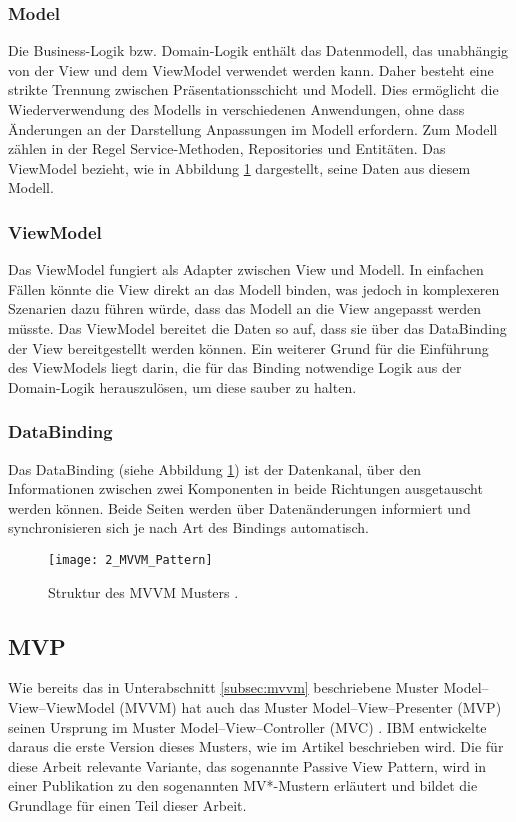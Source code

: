\subsubsection{Model}
Die Business-Logik bzw. Domain-Logik enthält das Datenmodell, das unabhängig von der View und dem ViewModel verwendet werden kann. 
Daher besteht eine strikte Trennung zwischen Präsentationsschicht und Modell. 
Dies ermöglicht die Wiederverwendung des Modells in verschiedenen Anwendungen, ohne dass Änderungen an der Darstellung Anpassungen im Modell erfordern. 
Zum Modell zählen in der Regel Service-Methoden, Repositories und Entitäten. 
Das ViewModel bezieht, wie in Abbildung \ref{fig:mvvm_pattern} dargestellt, seine Daten aus diesem Modell.

\subsubsection{ViewModel}
Das ViewModel fungiert als Adapter zwischen View und Modell. In einfachen Fällen könnte die View direkt an das Modell binden, was jedoch in komplexeren Szenarien dazu führen würde, dass das Modell an die View angepasst werden müsste. Das ViewModel bereitet die Daten so auf, dass sie über das DataBinding der View bereitgestellt werden können. 
Ein weiterer Grund für die Einführung des ViewModels liegt darin, die für das Binding notwendige Logik aus der Domain-Logik herauszulösen, um diese sauber zu halten.

\subsubsection{DataBinding}
Das DataBinding (siehe Abbildung \ref{fig:mvvm_pattern}) ist der Datenkanal, über den Informationen zwischen zwei Komponenten in beide Richtungen ausgetauscht werden können. 
Beide Seiten werden über Datenänderungen informiert und synchronisieren sich je nach Art des Bindings automatisch.

\begin{figure}[H]
    \centering
    \texttt{[image: 2\_MVVM\_Pattern]}
    \caption{Struktur des MVVM Musters \cite{Uncopy2024MVVMPattern}.}
    \label{fig:mvvm_pattern}
\end{figure}

\subsection{MVP}
\label{subsec:mvp}
Wie bereits das in Unterabschnitt \ref{subsec:mvvm} beschriebene Muster Model–View–ViewModel (MVVM) hat auch das Muster Model–View–Presenter (MVP) seinen Ursprung im Muster Model–View–Controller (MVC) \cite{Krasner1988MVC}. 
IBM entwickelte daraus die erste Version dieses Musters, wie im Artikel \cite{potel1996mvp} beschrieben wird. 
Die für diese Arbeit relevante Variante, das sogenannte Passive View Pattern, wird in einer Publikation zu den sogenannten MV*-Mustern \cite{mvp_ieee} erläutert und bildet die Grundlage für einen Teil dieser Arbeit.

